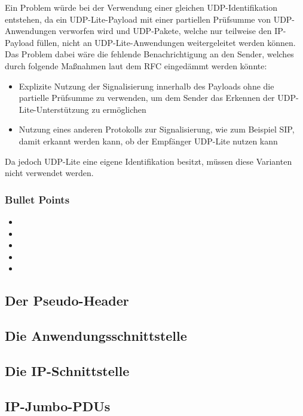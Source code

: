 \documentclass{beamer}
\begin{document}
Ein Problem würde bei der Verwendung einer gleichen UDP-Identifikation
entstehen, da ein UDP-Lite-Payload mit einer partiellen Prüfsumme
von UDP-Anwendungen verworfen wird und UDP-Pakete, welche nur teilweise
den IP-Payload füllen, nicht an UDP-Lite-Anwendungen weitergeleitet werden können.
Das Problem dabei wäre die fehlende Benachrichtigung an den Sender,
welches durch folgende Maßnahmen laut dem RFC eingedämmt werden könnte:
\begin{itemize}
\item Explizite Nutzung der Signalisierung innerhalb des Payloads
		ohne die partielle Prüfsumme zu verwenden, um dem Sender das
		Erkennen der UDP-Lite-Unterstützung zu ermöglichen
\item Nutzung eines anderen Protokolls zur Signalisierung,
		wie zum Beispiel SIP, damit erkannt werden kann,
		ob der Empfänger UDP-Lite nutzen kann
\end{itemize}

Da jedoch UDP-Lite eine eigene Identifikation besitzt,
müssen diese Varianten nicht verwendet werden.



\begin{frame}
\frametitle{Bullet Points}
\begin{itemize}
\item 
\item 
\item 
\item 
\item 
\end{itemize}
\end{frame}




\subsection{Der Pseudo-Header}
\subsection{Die Anwendungsschnittstelle}
\subsection{Die IP-Schnittstelle}
\subsection{IP-Jumbo-PDUs}
\end{document}

